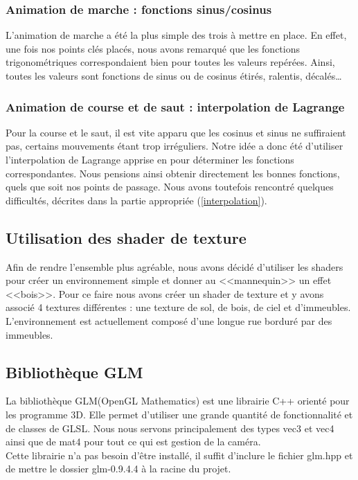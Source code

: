 \documentclass[10pt,a4paper,titlepage]{article}
\begin{document}
\subsubsection{Animation de marche : fonctions sinus/cosinus}
L'animation de marche a été la plus simple des trois à mettre en place. En effet, une fois nos points clés placés, nous avons remarqué que les fonctions trigonométriques correspondaient bien pour toutes les valeurs repérées. Ainsi, toutes les valeurs sont fonctions de sinus ou de cosinus étirés, ralentis, décalés\dots
\subsubsection{Animation de course et de saut : interpolation de Lagrange}
Pour la course et le saut, il est vite apparu que les cosinus et sinus ne suffiraient pas, certains mouvements étant trop irréguliers. Notre idée a donc été d'utiliser l'interpolation de Lagrange apprise en  pour déterminer les fonctions correspondantes. Nous pensions ainsi obtenir directement les bonnes fonctions, quels que soit nos points de passage. Nous avons toutefois rencontré quelques difficultés, décrites dans la partie appropriée (\ref{interpolation}).

\subsection{Utilisation des shader de texture}

Afin de rendre l'ensemble plus agréable, nous avons décidé d'utiliser les shaders pour créer un environnement simple et donner au <<mannequin>> un effet <<bois>>. Pour ce faire nous avons créer un shader de texture et y avons associé 4 textures différentes : une texture de sol, de bois, de ciel et d'immeubles.
L'environnement est actuellement composé d'une longue rue borduré par des immeubles. 

\subsection{Bibliothèque GLM}
La bibliothèque GLM(OpenGL Mathematics) est une librairie C++ orienté pour les programme 3D. Elle permet d'utiliser une grande quantité de fonctionnalité et de classes de GLSL. Nous nous servons principalement des types vec3 et vec4 ainsi que de mat4 pour tout ce qui est gestion de la caméra.\\
Cette librairie n'a pas besoin d'être installé, il suffit d'inclure le fichier glm.hpp et de mettre le dossier glm-0.9.4.4 à la racine du projet.
\end{document}
